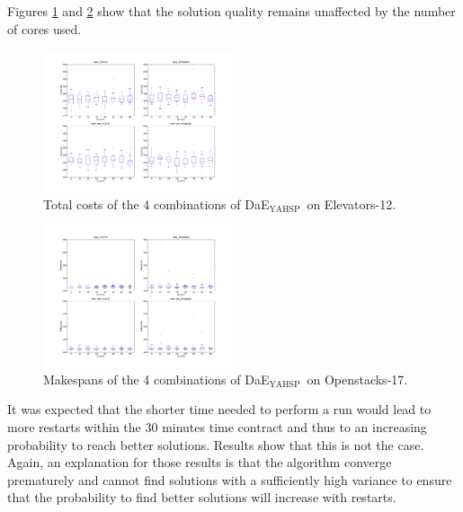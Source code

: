 \documentclass{sig-alternate}
\newcommand{\DAEYAHSP}{{\sc DaE$_{\text{YAHSP}}$}}
\newcommand{\OPENSTACKS}{{\sc Openstacks}}
\newcommand{\ELEVATORS}{{\sc Elevators}}
\begin{document}
Figures \ref{fig:exp2_totalcost_elevators-12_pop_96} and \ref{fig:exp2_makespan_openstacks-17_pop_96} show that the solution quality remains unaffected by the number of cores used.

\begin{figure}[htpb]
\begin{center}
\includegraphics[width=0.5\textwidth]{images/EXP2_Total_cost_IPC6_SEQ_ELEVATORS_12_S96.pdf}
\caption{Total costs of the 4 combinations of \DAEYAHSP\ on \ELEVATORS-12.}
\label{fig:exp2_totalcost_elevators-12_pop_96}
\end{center}
\end{figure}

\begin{figure}[htpb]
\begin{center}
\includegraphics[width=0.5\textwidth]{images/EXP2_Makespan_IPC6_TEMPO_OPENSTACKS_17_S96.pdf}
\caption{Makespans of the 4 combinations of \DAEYAHSP\ on \OPENSTACKS-17.}
\label{fig:exp2_makespan_openstacks-17_pop_96}
\end{center}
\end{figure}

It was expected that the shorter time needed to perform a run would lead
to more restarts within the 30 minutes time contract and thus to an increasing
probability to reach better solutions. Results show that this is not the case.
Again, an explanation for those results is that the
algorithm converge prematurely and cannot find solutions with a sufficiently
high variance to ensure that the probability to find better solutions will
increase with restarts.
\end{document}
